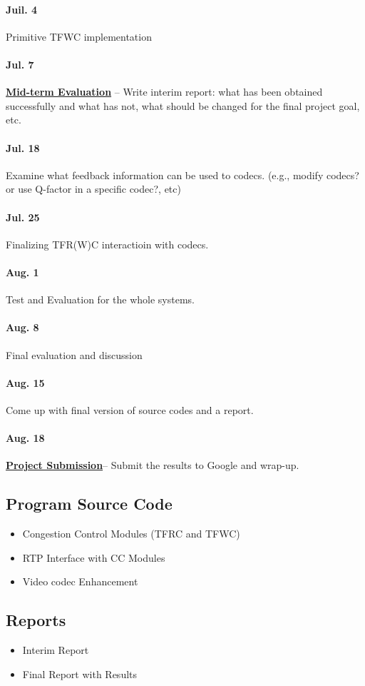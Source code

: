 \paragraph{\textsf{Juil. 4}} Primitive TFWC implementation

\paragraph{\textsf{Jul. 7}} \underline{\textbf{Mid-term Evaluation}} -- Write
interim report: what has been obtained successfully and what has not, what
should be changed for the final project goal, etc.

\paragraph{\textsf{Jul. 18}} Examine what feedback information can be used to
codecs.  (e.g., modify codecs? or use Q-factor in a specific codec?, etc)

\paragraph{\textsf{Jul. 25}} Finalizing TFR(W)C interactioin with codecs.

\paragraph{\textsf{Aug. 1}} Test and Evaluation for the whole systems.

\paragraph{\textsf{Aug. 8}} Final evaluation and discussion

\paragraph{\textsf{Aug. 15}} Come up with final version of source codes and a
report.

\paragraph{\textsf{Aug. 18}} \underline{\textbf{Project Submission}}-- Submit
the results to Google and wrap-up.


\subsection{\label{ssec:codes}Program Source Code}

\begin{itemize} 
\item Congestion Control Modules (TFRC and TFWC) 
\item RTP Interface with CC Modules 
\item Video codec Enhancement 
\end{itemize}

\subsection{\label{ssec:docs}Reports}


\begin{itemize}
\item Interim Report
\item Final Report with Results
\end{itemize}

\newpage
